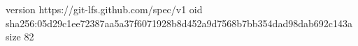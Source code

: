 version https://git-lfs.github.com/spec/v1
oid sha256:05d29c1ee72387aa5a37f6071928b8d452a9d7568b7bb354dad98dab692c143a
size 82
